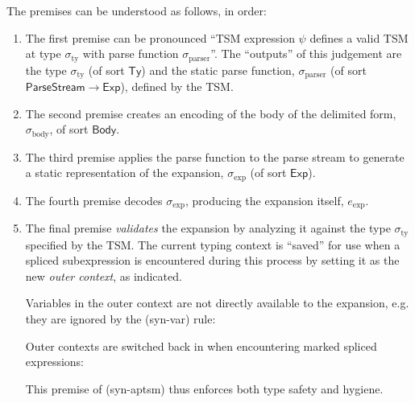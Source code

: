 The premises can be understood as follows, in order:
\begin{enumerate}
\item The first premise can be pronounced ``TSM expression $\psi$ defines a valid TSM at type $\sigma_\text{ty}$ with parse function $\sigma_\text{parser}$''.  The ``outputs'' of this judgement are the type $\sigma_\text{ty}$ (of sort $\mathsf{Ty}$) and the static parse function, $\sigma_\text{parser}$ (of sort $\mathsf{ParseStream} \rightarrow \mathsf{Exp}$), defined by the TSM.%
\item The second premise creates an encoding of the body of the delimited form, $\sigma_\text{body}$, of sort $\mathsf{Body}$.
\item The third premise applies the parse function to the parse stream to generate a static representation of the expansion, $\sigma_\text{exp}$ (of sort $\mathsf{Exp}$).%
\item The fourth premise decodes $\sigma_\text{exp}$, producing the expansion itself, $e_\text{exp}$.
\item The final premise \emph{validates} the expansion by analyzing it against the type $\sigma_\text{ty}$ specified by the TSM. The {current} typing context is ``saved'' for use when a spliced subexpression is encountered during this process by setting it as the new \emph{outer context}, as indicated.

Variables in the outer context are not directly available to the expansion, e.g. they are ignored by the (syn-var) rule:
\begin{mathpar}
\end{mathpar}

Outer contexts are switched back in when encountering marked spliced expressions:
\begin{mathpar}

\end{mathpar}


This premise of (syn-aptsm) thus enforces both type safety and hygiene.

\end{enumerate}
